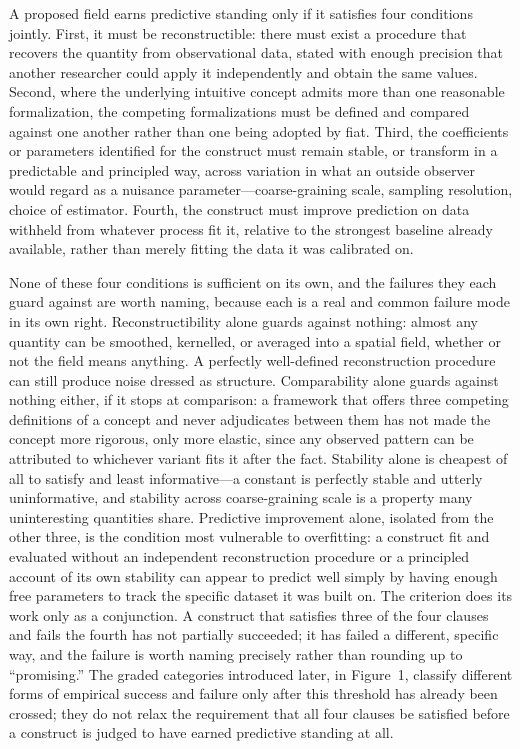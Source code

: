 \documentclass[11pt]{article}
\begin{document}
A proposed field earns predictive standing only if it satisfies four conditions jointly. First, it must be reconstructible: there must exist a procedure that recovers the quantity from observational data, stated with enough precision that another researcher could apply it independently and obtain the same values. Second, where the underlying intuitive concept admits more than one reasonable formalization, the competing formalizations must be defined and compared against one another rather than one being adopted by fiat. Third, the coefficients or parameters identified for the construct must remain stable, or transform in a predictable and principled way, across variation in what an outside observer would regard as a nuisance parameter---coarse-graining scale, sampling resolution, choice of estimator. Fourth, the construct must improve prediction on data withheld from whatever process fit it, relative to the strongest baseline already available, rather than merely fitting the data it was calibrated on.

None of these four conditions is sufficient on its own, and the failures they each guard against are worth naming, because each is a real and common failure mode in its own right. Reconstructibility alone guards against nothing: almost any quantity can be smoothed, kernelled, or averaged into a spatial field, whether or not the field means anything. A perfectly well-defined reconstruction procedure can still produce noise dressed as structure. Comparability alone guards against nothing either, if it stops at comparison: a framework that offers three competing definitions of a concept and never adjudicates between them has not made the concept more rigorous, only more elastic, since any observed pattern can be attributed to whichever variant fits it after the fact. Stability alone is cheapest of all to satisfy and least informative---a constant is perfectly stable and utterly uninformative, and stability across coarse-graining scale is a property many uninteresting quantities share. Predictive improvement alone, isolated from the other three, is the condition most vulnerable to overfitting: a construct fit and evaluated without an independent reconstruction procedure or a principled account of its own stability can appear to predict well simply by having enough free parameters to track the specific dataset it was built on. The criterion does its work only as a conjunction. A construct that satisfies three of the four clauses and fails the fourth has not partially succeeded; it has failed a different, specific way, and the failure is worth naming precisely rather than rounding up to ``promising.'' The graded categories introduced later, in Figure~1, classify different forms of empirical success and failure only after this threshold has already been crossed; they do not relax the requirement that all four clauses be satisfied before a construct is judged to have earned predictive standing at all.
\end{document}
